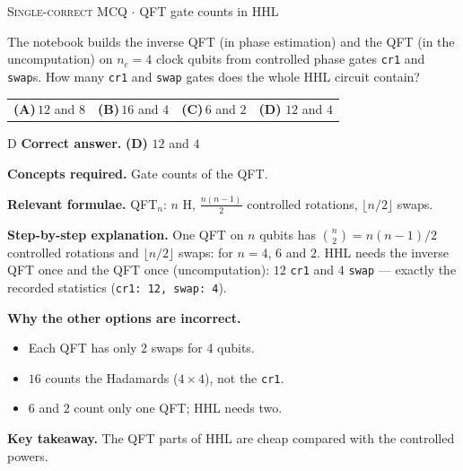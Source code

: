 \documentclass[11pt,a4paper]{article}
\newcommand{\optlabel}[1]{\textbf{(#1)}}
\newcommand{\correctlabel}[1]{\textcolor{okgreen}{\textbf{(#1)}\,\ding{51}}}
\newenvironment{qitem}[1]{\begin{list}{}{\setlength{\leftmargin}{3.3em}\setlength{\labelwidth}{3.1em}%
  \setlength{\labelsep}{0.2em}\setlength{\topsep}{3pt}\setlength{\parsep}{3pt}}\item[\textbf{Q.#1}\hfill]}{\end{list}}
\newcommand{\qsep}{\par\vspace{2pt}{\color{black!15}\hrule}\vspace{4pt}}
\newcommand{\qmeta}[2]{{\footnotesize\color{black!60}\textsc{#1} \;$\cdot$\; #2}\par}
\begin{document}
\begin{qitem}{26}
\qmeta{Single-correct MCQ}{QFT gate counts in HHL}
The notebook builds the inverse QFT (in phase estimation) and the QFT (in the uncomputation) on $n_c = 4$ clock qubits from controlled phase gates
\texttt{cr1} and \texttt{swap}s. How many \texttt{cr1} and \texttt{swap} gates does the whole HHL circuit contain?
\par\smallskip\noindent\begin{tabularx}{\linewidth}{@{}*{4}{L}@{}}
\optlabel{A}\,$12$ and $8$ & \optlabel{B}\,$16$ and $4$ & \optlabel{C}\,$6$ and $2$ & \correctlabel{D}\,$12$ and $4$
\end{tabularx}
\end{qitem}
\begin{solbox}{D}
\textbf{\color{brand}Correct answer.} \textcolor{okgreen}{\textbf{(D)}} $12$ and $4$

\textbf{\color{brand}Concepts required.} Gate counts of the QFT.

\textbf{\color{brand}Relevant formulae.} QFT$_n$: $n$ H, $\frac{n(n-1)}{2}$ controlled rotations, $\lfloor n/2\rfloor$ swaps.

\textbf{\color{brand}Step-by-step explanation.} One QFT on $n$ qubits has $\binom n2 = n(n-1)/2$ controlled rotations and $\lfloor n/2\rfloor$ swaps: for $n = 4$, $6$ and $2$. HHL needs the inverse QFT once and the QFT once
(uncomputation): $12$ \texttt{cr1} and $4$ \texttt{swap} --- exactly the recorded statistics (\texttt{cr1: 12, swap: 4}).

\textbf{\color{brand}Why the other options are incorrect.}
\begin{itemize}[leftmargin=2.4em, itemsep=1pt, topsep=2pt]
\item[\textbf{(A)}] Each QFT has only 2 swaps for 4 qubits.
\item[\textbf{(B)}] $16$ counts the Hadamards ($4\times4$), not the \texttt{cr1}.
\item[\textbf{(C)}] $6$ and $2$ count only one QFT; HHL needs two.
\end{itemize}
\textbf{\color{brand}Key takeaway.} The QFT parts of HHL are cheap compared with the controlled powers.
\end{solbox}
\qsep
\end{document}
